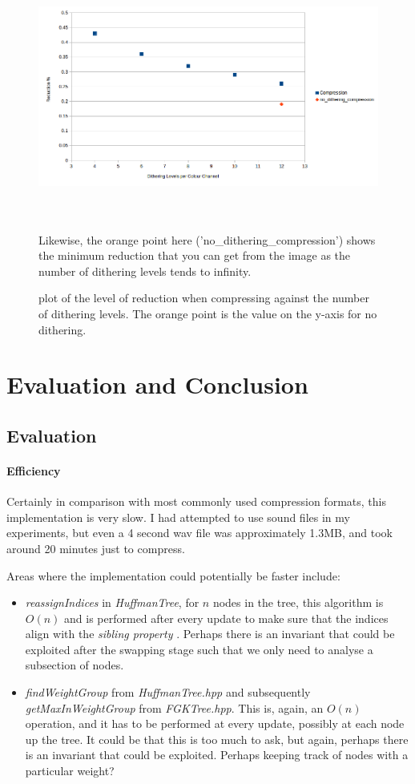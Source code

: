 \documentclass[]{article}
\begin{document}
\clearpage
\begin{figure}[!htbp]
	\begin{minipage}[b]{\textwidth}
		\includegraphics[width=\textwidth]{img/dithering-compression}
		\caption{plot of the level of reduction when compressing against the number of dithering levels. The orange point is the value on the y-axis for no dithering.}
	\end{minipage}
	\\\\
	Likewise, the orange point here ('no\_dithering\_compression') shows the minimum reduction that you can get from the image as the number of dithering levels tends to infinity.
\end{figure}

\clearpage
\section{Evaluation and Conclusion}
\subsection{Evaluation}
\paragraph{Efficiency} Certainly in comparison with most commonly used compression formats, this implementation is very slow. I had attempted to use sound files in my experiments, but even a 4 second wav file was approximately 1.3MB, and took around 20 minutes just to compress.

Areas where the implementation could potentially be faster include:
\begin{itemize}
	\item \emph{reassignIndices} in \emph{HuffmanTree}, for $n$ nodes in the tree, this algorithm is $O(n)$ and is performed after every update to make sure that the indices align with the \emph{sibling property} \citet{Sayood06}. Perhaps there is an invariant that could be exploited after the swapping stage such that we only need to analyse a subsection of nodes.
	\item \emph{findWeightGroup} from \emph{HuffmanTree.hpp} and subsequently \emph{getMaxInWeightGroup} from \emph{FGKTree.hpp}. This is, again, an $O(n)$ operation, and it has to be performed at every update, possibly at each node up the tree.
	It could be that this is too much to ask, but again, perhaps there is an invariant that could be exploited. Perhaps keeping track of nodes with a particular weight?
\end{itemize}
\end{document}
